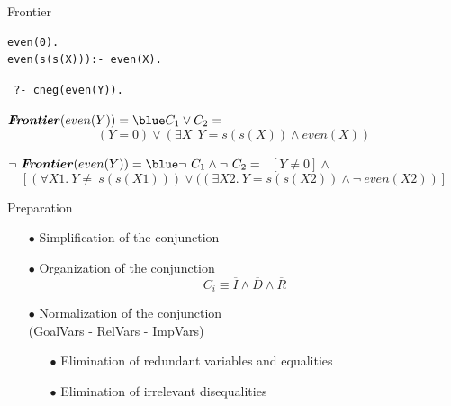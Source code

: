 \documentclass[pdf,slideColor,contemporain]{prosper}
\begin{document}
\begin{slide}{Frontier}
\begin{small}
\begin{minipage}{2.5in}
{\blue
 \begin{verbatim}
even(0).
even(s(s(X))):- even(X).

 \end{verbatim}
}
\end{minipage} 
\begin{minipage}{1.5in}
{\blue
 \begin{verbatim}
 ?- cneg(even(Y)).

 \end{verbatim}
}
\end{minipage}
\end{small}

\begin{small}
$\mbox{\bf\emph{Frontier}}(even(Y)) = {\blue C_1 \vee C_2} = $ 
\[ ( Y=0 ) \vee ( \exists X~~ Y=s(s(X)) \wedge even(X) )  \] 

$\neg ~\mbox{\bf \emph{Frontier}}(even(Y)) = {\blue \neg~ C_1 \wedge
\neg~ C_2} = $ $ ~~ [ Y \neq 0 ] \wedge $\[\left[ (\forall X1.~ Y
\neq ~s(s(X1))) \vee ( (\exists X2.~ Y=s(s(X2)) \wedge \neg~ even(X2)
)\right] \]
\end{small}

\end{slide}
\begin{slide}{Preparation}
     \begin{itemize}
        \item[$\bullet$] {\blue Simplification} of the conjunction
        \item[$\bullet$] {\blue Organization} of the conjunction
\[ C_i \equiv \overline{I} \wedge \overline{D} \wedge \overline{R} \]
        \item[$\bullet$] {\blue Normalization} of the conjunction \\
                      (GoalVars - RelVars - ImpVars)
              \begin{itemize}
                \item[$\bullet$] Elimination of {\blue redundant variables} and {\blue equalities}
                \item[$\bullet$] Elimination of {\blue irrelevant disequalities}
              \end{itemize}
     \end{itemize}
\end{slide}
\end{document}
